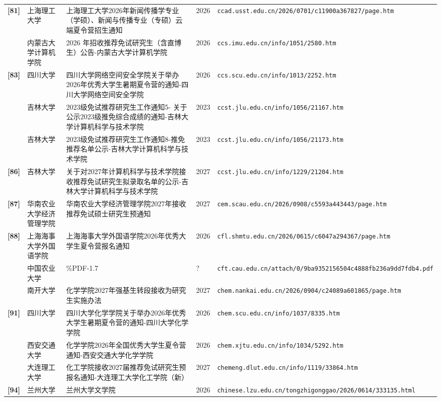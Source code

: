 {\begin{longtable}{@{}p{1.15cm}p{2.9cm}p{6.3cm}p{0.85cm}p{5.0cm}@{}}
\textbf{[81]} & 上海理工大学 & 上海理工大学2026年新闻传播学专业（学硕）、新闻与传播专业（专硕）云端夏令营招生通知 & 2026 & \texttt{ccad.usst.edu.cn/2026/0701/c11900a367827/page.htm} \\
[82] & 内蒙古大学计算机学院 & 2026 年招收推荐免试研究生（含直博生）公告-内蒙古大学计算机学院 & 2026 & \texttt{ccs.imu.edu.cn/info/1051/2580.htm} \\
\textbf{[83]} & 四川大学 & 四川大学网络空间安全学院关于举办2026年优秀大学生暑期夏令营的通知-四川大学网络空间安全学院 & 2026 & \texttt{ccs.scu.edu.cn/info/1013/2252.htm} \\
[84] & 吉林大学 & 2023级免试推荐研究生工作通知5- 关于公示2023级推免综合成绩的通知-吉林大学计算机科学与技术学院 & 2023 & \texttt{ccst.jlu.edu.cn/info/1056/21167.htm} \\
[85] & 吉林大学 & 2023级免试推荐研究生工作通知8-推免推荐名单公示-吉林大学计算机科学与技术学院 & 2023 & \texttt{ccst.jlu.edu.cn/info/1056/21173.htm} \\
\textbf{[86]} & 吉林大学 & 关于对2027年计算机科学与技术学院接收推荐免试研究生拟录取名单的公示-吉林大学计算机科学与技术学院 & 2027 & \texttt{ccst.jlu.edu.cn/info/1229/21204.htm} \\
\textbf{[87]} & 华南农业大学经济管理学院 & 华南农业大学经济管理学院2027年接收推荐免试硕士研究生预通知 & 2027 & \texttt{cem.scau.edu.cn/2026/0908/c5593a443443/page.htm} \\
\textbf{[88]} & 上海海事大学外国语学院 & 上海海事大学外国语学院2026年优秀大学生夏令营报名通知 & 2026 & \texttt{cfl.shmtu.edu.cn/2026/0615/c6047a294367/page.htm} \\
[89] & 中国农业大学 & \%PDF-1.7 & ? & \texttt{cft.cau.edu.cn/attach/0/9ba9352156504c4888fb236a9dd7fdb4.pdf} \\
[90] & 南开大学 & 化学学院2027年强基生转段接收为研究生实施办法 & 2027 & \texttt{chem.nankai.edu.cn/2026/0904/c24089a601865/page.htm} \\
\textbf{[91]} & 四川大学 & 四川大学化学学院关于举办2026年优秀大学生暑期夏令营的通知-四川大学化学学院 & 2026 & \texttt{chem.scu.edu.cn/info/1037/8335.htm} \\
[92] & 西安交通大学 & 化学学院2026年全国优秀大学生夏令营通知-西安交通大学化学学院 & 2026 & \texttt{chem.xjtu.edu.cn/info/1034/5292.htm} \\
[93] & 大连理工大学 & 化工学院接收2027届推荐免试研究生预报名通知-大连理工大学化工学院（新） & 2027 & \texttt{chemeng.dlut.edu.cn/info/1119/33864.htm} \\
\textbf{[94]} & 兰州大学 & 兰州大学文学院 & 2026 & \texttt{chinese.lzu.edu.cn/tongzhigonggao/2026/0614/333135.html} \\

\end{longtable}}
